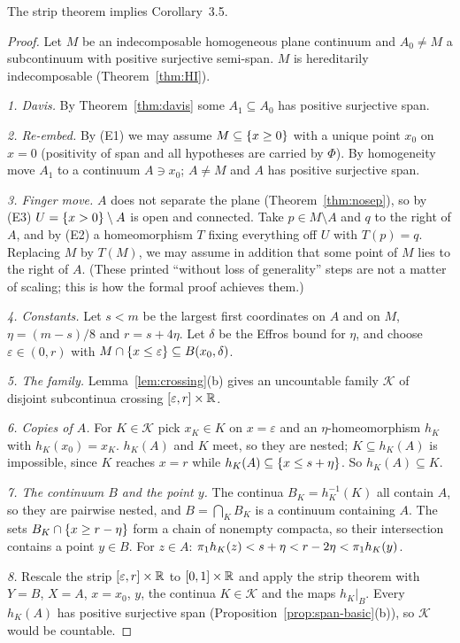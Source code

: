 
\begin{theorem}\label{thm:ot35}
The strip theorem implies Corollary~3.5.
\end{theorem}

\begin{proof}
Let $M$ be an indecomposable homogeneous plane continuum and $A_0\ne M$ a subcontinuum with positive surjective semi-span. $M$ is hereditarily
indecomposable (Theorem~\ref{thm:HI}).

\emph{1. Davis.} By Theorem~\ref{thm:davis} some $A_1\subseteq A_0$ has positive surjective span.

\emph{2. Re-embed.} By (E1) we may assume $M\subseteq\left\{ x\ge0 \right\}$ with a unique point $x_0$ on $x=0$ (positivity of span and all hypotheses are carried
by $\Phi$). By homogeneity move $A_1$ to a continuum $A\ni x_0$; $A\ne M$ and $A$ has positive surjective span.

\emph{3. Finger move.} $A$ does not separate the plane (Theorem~\ref{thm:nosep}), so by (E3) $U=\left\{ x>0 \right\}\setminus A$ is open and connected. Take
$p\in M\setminus A$ and $q$ to the right of $A$, and by (E2) a homeomorphism $T$ fixing everything off $U$ with $T(p)=q$. Replacing $M$ by $T(M)$, we may
assume in addition that some point of $M$ lies to the right of $A$. (These printed ``without loss of generality'' steps are not a matter of
scaling; this is how the formal proof achieves them.)

\emph{4. Constants.} Let $s<m$ be the largest first coordinates on $A$ and on $M$, $\eta=(m-s)/8$ and $r=s+4\eta$. Let $\delta$ be the Effros bound for $\eta$,
and choose $\varepsilon\in(0,r)$ with $M\cap\left\{ x\le\varepsilon \right\}\subseteq B(x_0,\delta)$.

\emph{5. The family.} Lemma~\ref{lem:crossing}(b) gives an uncountable family $\mathcal K$ of disjoint subcontinua crossing $[\varepsilon,r]\times\mathbb{R}$.

\emph{6. Copies of $A$.} For $K\in\mathcal K$ pick $x_K\in K$ on $x=\varepsilon$ and an $\eta$-homeomorphism $h_K$ with $h_K(x_0)=x_K$. $h_K(A)$ and $K$ meet, so
they are nested; $K\subseteq h_K(A)$ is impossible, since $K$ reaches $x=r$ while $h_K(A)\subseteq\left\{ x\le s+\eta \right\}$. So $h_K(A)\subseteq K$.

\emph{7. The continuum $B$ and the point $y$.} The continua $B_K=h_K^{-1}(K)$ all contain $A$, so they are pairwise nested, and $B=\bigcap_KB_K$ is a
continuum containing $A$. The sets $B_K\cap\left\{ x\ge r-\eta \right\}$ form a chain of nonempty compacta, so their intersection contains a point $y\in B$. For $z\in
A$: $\pi_{1}h_K(z)<s+\eta<r-2\eta<\pi_{1}h_K(y)$.

\emph{8.} Rescale the strip $[\varepsilon,r]\times\mathbb{R}$ to $[0,1]\times\mathbb{R}$ and apply the strip theorem with $Y=B$, $X=A$, $x=x_0$, $y$, the continua $K\in\mathcal K$ and the
maps $h_K|_B$. Every $h_K(A)$ has positive surjective span (Proposition~\ref{prop:span-basic}(b)), so $\mathcal K$ would be countable.
\end{proof}

